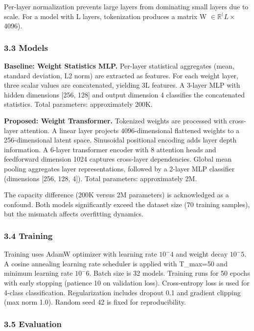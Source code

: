 Per-layer normalization prevents large layers from dominating small layers due to scale. For a model with L layers, tokenization produces a matrix W $\in \mathbb{R}^(L \times$ 4096).

\subsubsection{3.3 Models}

\textbf{Baseline: Weight Statistics MLP.} Per-layer statistical aggregates (mean, standard deviation, L2 norm) are extracted as features. For each weight layer, three scalar values are concatenated, yielding 3L features. A 3-layer MLP with hidden dimensions [256, 128] and output dimension 4 classifies the concatenated statistics. Total parameters: approximately 200K.

\textbf{Proposed: Weight Transformer.} Tokenized weights are processed with cross-layer attention. A linear layer projects 4096-dimensional flattened weights to a 256-dimensional latent space. Sinusoidal positional encoding adds layer depth information. A 6-layer transformer encoder with 8 attention heads and feedforward dimension 1024 captures cross-layer dependencies. Global mean pooling aggregates layer representations, followed by a 2-layer MLP classifier (dimensions [256, 128, 4]). Total parameters: approximately 2M.

The capacity difference (200K versus 2M parameters) is acknowledged as a confound. Both models significantly exceed the dataset size (70 training samples), but the mismatch affects overfitting dynamics.

\subsubsection{3.4 Training}

Training uses AdamW optimizer with learning rate $10^-4$ and weight decay $10^-5$. A cosine annealing learning rate scheduler is applied with T\_max=50 and minimum learning rate $10^-6$. Batch size is 32 models. Training runs for 50 epochs with early stopping (patience 10 on validation loss). Cross-entropy loss is used for 4-class classification. Regularization includes dropout 0.1 and gradient clipping (max norm 1.0). Random seed 42 is fixed for reproducibility.

\subsubsection{3.5 Evaluation}

